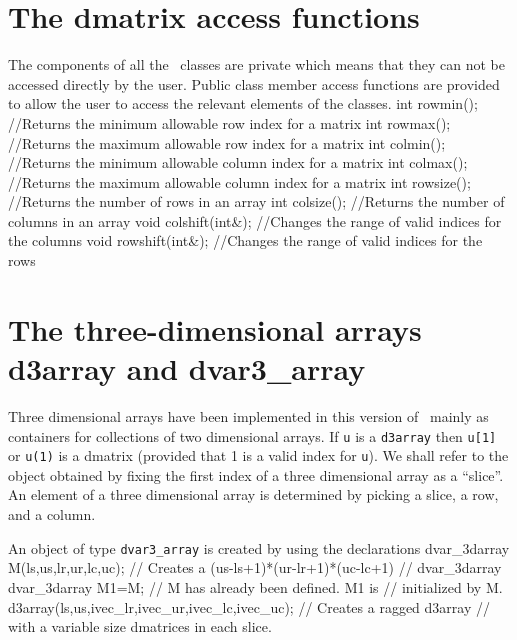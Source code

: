\documentclass[12pt]{book}
\begin{document}
\section{The dmatrix access functions}
The components of all the \AD\ classes are private which means that
they can not be accessed directly by the user. 
Public class member access functions are provided
to allow the user to access the relevant elements of the classes.
\beginexamplea
int rowmin();   //Returns the minimum allowable row index  for a matrix
int rowmax();   //Returns the maximum allowable row index  for a matrix
int colmin();   //Returns the minimum allowable column index  for a matrix
int colmax();   //Returns the maximum allowable column index  for a matrix
int rowsize();  //Returns the number of rows in an array
int colsize();  //Returns the number of columns in an array
void colshift(int&);  //Changes the range of valid indices for the columns
void rowshift(int&);  //Changes the range of valid indices for the rows 
\endexample
{}   
  

\section{The three-dimensional arrays d3array and dvar3\_array}
Three dimensional arrays have been implemented in this version of
\AD\ mainly as containers for collections of two dimensional arrays. 
If {\tt u} is a {\tt d3array} then {\tt u[1]} or
{\tt u(1)} is a dmatrix (provided that 1 is a valid index for {\tt u}). 
We shall refer to the object
obtained by fixing the first index of a three dimensional
array as a ``slice''. An element of a three
dimensional array is determined by picking a slice, a row, and a column.
  

An object of type {\tt dvar3\_array} is created by using the declarations
\beginexamplea
dvar_3darray M(ls,us,lr,ur,lc,uc); // Creates a (us-ls+1)*(ur-lr+1)*(uc-lc+1) 
                                   // dvar_3darray
dvar_3darray M1=M;                 // M has already been defined. M1 is 
                                   // initialized by M.
d3array(ls,us,ivec_lr,ivec_ur,ivec_lc,ivec_uc); // Creates a ragged d3array 
                            // with a variable size dmatrices in each slice.
\endexample
\end{document}
